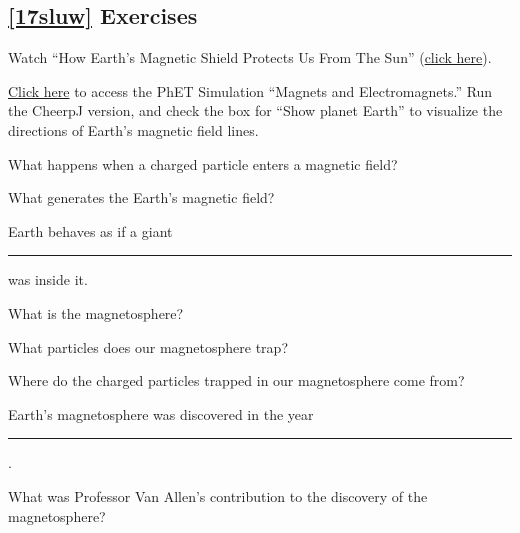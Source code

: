 \documentclass{article}
\numberwithin{equation}{section}
\numberwithin{figure}{section}
\begin{document}
\begin{multicols}{2}
\subsection*{\ref{17sluw} Exercises}

\begin{exercise}
    Watch ``How Earth's Magnetic Shield Protects Us From The Sun'' (\href{https://youtu.be/URN-XyZD2vQ}{click here}).
\end{exercise}

\begin{exercise}
    \href{https://phet.colorado.edu/en/simulations/magnets-and-electromagnets}{Click here} to access the PhET Simulation ``Magnets and Electromagnets.'' Run the CheerpJ version, and check the box for ``Show planet Earth'' to visualize the directions of Earth's magnetic field lines.
\end{exercise}

\begin{exercise}
    What happens when a charged particle enters a magnetic field?
\end{exercise}

\begin{exercise}
    What generates the Earth's magnetic field?
\end{exercise}

\begin{exercise}
    Earth behaves as if a giant \rule{2cm}{0.15mm} was inside it.
\end{exercise}

\begin{exercise}
    What is the magnetosphere?
\end{exercise}

\begin{exercise}
    What particles does our magnetosphere trap?
\end{exercise}

\begin{exercise}
    Where do the charged particles trapped in our magnetosphere come from?
\end{exercise}

\begin{exercise}
    Earth's magnetosphere was discovered in the year \rule{2cm}{0.15mm}.
\end{exercise}

\begin{exercise}
    What was Professor Van Allen's contribution to the discovery of the magnetosphere?
\end{exercise}
\end{multicols}
\end{document}
